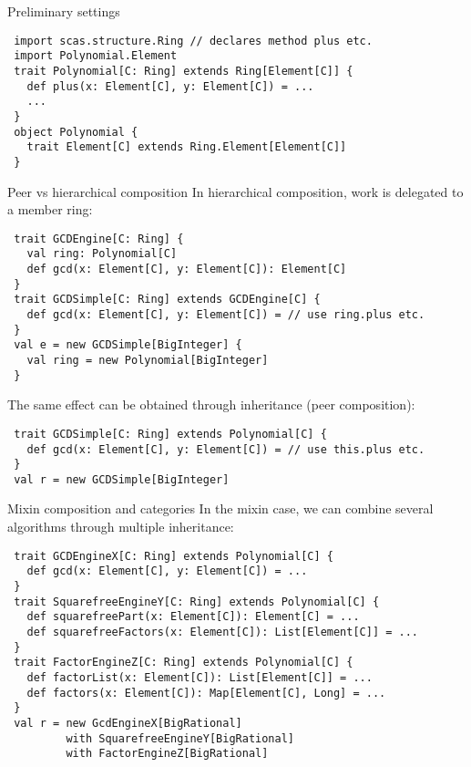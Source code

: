 \documentclass[final]{beamer}
\begin{document}
\begin{frame}[fragile]
\begin{columns}[t]
\begin{column}{.3\linewidth}
  \begin{block}{\large Preliminary settings}
\tiny
\begin{lstlisting}
 import scas.structure.Ring // declares method plus etc.
 import Polynomial.Element
 trait Polynomial[C: Ring] extends Ring[Element[C]] {
   def plus(x: Element[C], y: Element[C]) = ...
   ...
 }
 object Polynomial {
   trait Element[C] extends Ring.Element[Element[C]]
 }
\end{lstlisting}
  \end{block}
  \hfill
  \begin{block}{\large Peer vs hierarchical composition}
\tiny
{\footnotesize In hierarchical composition, work is delegated to
a member ring:}\par
\begin{lstlisting}
 trait GCDEngine[C: Ring] {
   val ring: Polynomial[C]
   def gcd(x: Element[C], y: Element[C]): Element[C]
 }
 trait GCDSimple[C: Ring] extends GCDEngine[C] {
   def gcd(x: Element[C], y: Element[C]) = // use ring.plus etc.
 }
 val e = new GCDSimple[BigInteger] {
   val ring = new Polynomial[BigInteger]
 }
\end{lstlisting}
{\footnotesize The same effect can be obtained through inheritance
(peer composition):}\par
\begin{lstlisting}
 trait GCDSimple[C: Ring] extends Polynomial[C] {
   def gcd(x: Element[C], y: Element[C]) = // use this.plus etc.
 }
 val r = new GCDSimple[BigInteger]
\end{lstlisting}
  \end{block}
  \hfill
  \begin{block}{\large Mixin composition and categories}
\tiny
{\footnotesize In the mixin case, we can combine several
algorithms through multiple inheritance:}\par
\begin{lstlisting}
 trait GCDEngineX[C: Ring] extends Polynomial[C] {
   def gcd(x: Element[C], y: Element[C]) = ...
 }
 trait SquarefreeEngineY[C: Ring] extends Polynomial[C] {
   def squarefreePart(x: Element[C]): Element[C] = ...
   def squarefreeFactors(x: Element[C]): List[Element[C]] = ...
 }
 trait FactorEngineZ[C: Ring] extends Polynomial[C] {
   def factorList(x: Element[C]): List[Element[C]] = ...
   def factors(x: Element[C]): Map[Element[C], Long] = ...
 }
 val r = new GcdEngineX[BigRational] 
         with SquarefreeEngineY[BigRational]
         with FactorEngineZ[BigRational]
\end{lstlisting}

\end{block}
\end{column}
\end{columns}
\end{frame}
\end{document}
